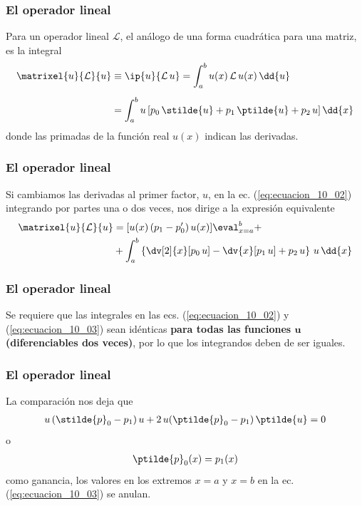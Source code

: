 \begin{frame}
\frametitle{El operador lineal}
Para un operador lineal $\mathcal{L}$, el análogo de una forma cuadrática para una matriz, es la integral
\begin{align}
\begin{aligned}[b]
\matrixel{u}{\mathcal{L}}{u} &\equiv \ip{u}{\mathcal{L} \, u} = \int_{a}^{b} u(x) \, \mathcal{L} \, u(x) \, \dd{u} \\[0.5em]
&= \int_{a}^{b} u \, [ p_{0} \, \stilde{u} + p_{1} \, \ptilde{u} + p_{2} \, u ] \, \dd{x}
\end{aligned}
\label{eq:ecuacion_10_02}
\end{align}
donde las primadas de la función real $u(x)$ indican las derivadas.
\end{frame}
\begin{frame}
\frametitle{El operador lineal}
Si cambiamos las derivadas al primer factor, $u$, en la ec. (\ref{eq:ecuacion_10_02}) integrando por partes una o dos veces, nos dirige a la expresión equivalente
{\fontsize{12}{12}\selectfont
\begin{align}
\begin{aligned}
\matrixel{u}{\mathcal{L}}{u} &= [ u(x) \, ( p_{1} - p_{0}^{\prime} ) \, u(x)] \eval_{x=a}^{b} + \\
&+ \int_{a}^{b} \left\{ \dv[2]{x} [p_{0} \, u] - \dv{x} [p_{1} \, u] + p_{2} \, u \right\} \, u \, \dd{x}
\end{aligned}
\label{eq:ecuacion_10_03}
\end{align}}
\end{frame}
\begin{frame}
\frametitle{El operador lineal}
Se requiere que las integrales en las ecs. (\ref{eq:ecuacion_10_02}) y (\ref{eq:ecuacion_10_03}) sean idénticas \textbf{para todas las funciones $\bm{u}$ (diferenciables dos veces)}, por lo que los integrandos deben de ser iguales.
\end{frame}
\begin{frame}
\frametitle{El operador lineal}
La comparación nos deja que
\begin{align*}
u \, (\stilde{p}_{0} - p_{1}) \, u + 2 \, u (\ptilde{p}_{0} - p_{1}) \, \ptilde{u} = 0
\end{align*}
o
\begin{align}
\ptilde{p}_{0} (x) = p_{1} (x)
\label{eq:ecuacion_10_04}
\end{align}
como ganancia, los valores en los extremos $x = a$ y $x = b$ en la ec. (\ref{eq:ecuacion_10_03}) se anulan.
\end{frame}
